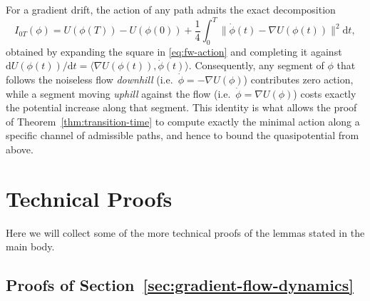 \documentclass{article} %
\newcommand{\dd}{\mathrm d}
\theoremstyle{plain}
\theoremstyle{definition}
\theoremstyle{remark}
\begin{document}
For a gradient drift, the action of any path admits the exact decomposition
\begin{equation}
    I_{0T}(\phi) = U(\phi(T))-U(\phi(0)) + \frac14\int_0^T\bigl\|\dot\phi(t)-\nabla U(\phi(t))\bigr\|^2\dd t,
    \label{eq:gradient-decomposition}
\end{equation}
obtained by expanding the square in \eqref{eq:fw-action} and completing it against $\dd U(\phi(t))/\dd t = \langle\nabla U(\phi(t)),\dot\phi(t)\rangle$. Consequently, any segment of $\phi$ that follows the noiseless flow \emph{downhill} (i.e.\ $\dot\phi=-\nabla U(\phi)$) contributes zero action, while a segment moving \emph{uphill} against the flow (i.e.\ $\dot\phi=\nabla U(\phi)$) costs exactly the potential increase along that segment. This identity is what allows the proof of Theorem~\ref{thm:transition-time} to compute exactly the minimal action along a specific channel of admissible paths, and hence to bound the quasipotential from above.

\section{Technical Proofs}
\label{apx:technical-proofs}

Here we will collect some of the more technical proofs of the lemmas stated in the main body.

\subsection{Proofs of Section~\ref{sec:gradient-flow-dynamics}}
\end{document}
